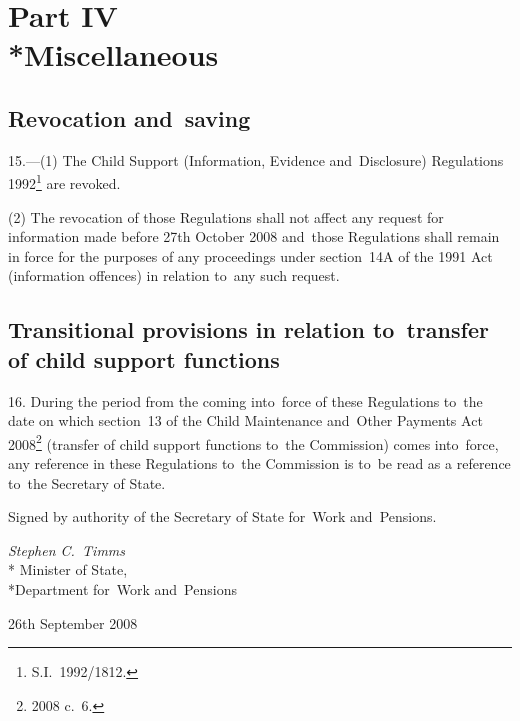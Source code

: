 \documentclass[12pt,a4paper]{article}
\begin{document}

\section[Part IV --- Miscellaneous]{Part IV\\*Miscellaneous}

\renewcommand\parthead{--- Part~IV}

\subsection[15. Revocation and~saving]{Revocation and~saving}

15.---(1)  The Child Support (Information, Evidence and~Disclosure) Regulations 1992\footnote{S.I.~1992/1812.} are revoked.

(2) The revocation of those Regulations shall not affect any request for information made before 27th October 2008 and~those Regulations shall remain in force for the purposes of any proceedings under section~14A of the 1991 Act (information offences) in relation to~any such request.

\subsection[16. Transitional provisions in relation to~transfer of child support functions]{Transitional provisions in relation to~transfer of child support functions}

16.  During the period from the coming into~force of these Regulations to~the date on which section~13 of the Child Maintenance and~Other Payments Act 2008\footnote{2008 c.~6.} (transfer of child support functions to~the Commission) comes into~force, any reference in these Regulations to~the Commission is to~be read as a reference to~the Secretary of State. 

\bigskip

Signed 
by authority of the 
Secretary of State for~Work and~Pensions.

{\raggedleft
\emph{Stephen C.~Timms}\\*
Minister
of State,\\*Department for~Work and~Pensions

}

26th September 2008

\small
\end{document}

